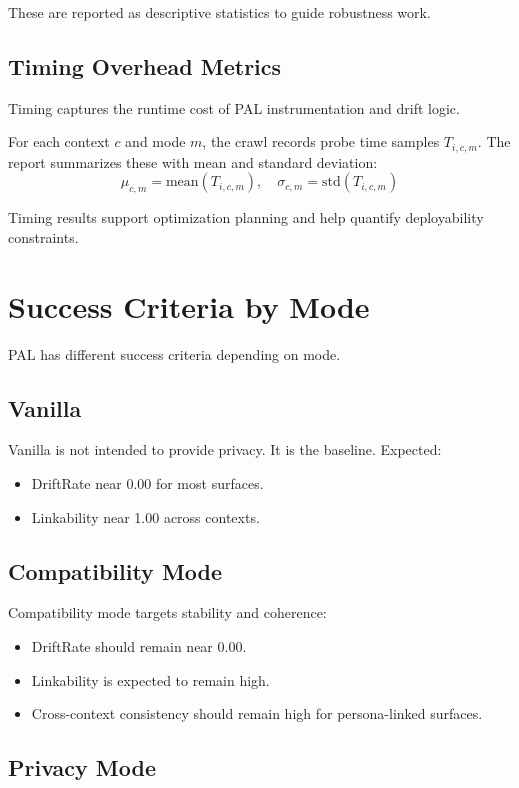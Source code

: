 \documentclass[11pt]{report}
\begin{document}
These are reported as descriptive statistics to guide robustness work.

\subsection{Timing Overhead Metrics}

Timing captures the runtime cost of PAL instrumentation and drift logic.

For each context $c$ and mode $m$, the crawl records probe time samples $T_{i,c,m}$.
The report summarizes these with mean and standard deviation:
\[
\mu_{c,m} = \text{mean}(T_{i,c,m}), \quad \sigma_{c,m} = \text{std}(T_{i,c,m})
\]

Timing results support optimization planning and help quantify deployability constraints.

\section{Success Criteria by Mode}

PAL has different success criteria depending on mode.

\subsection{Vanilla}

Vanilla is not intended to provide privacy. It is the baseline.
Expected:
\begin{itemize}
    \item DriftRate near 0.00 for most surfaces.
    \item Linkability near 1.00 across contexts.
\end{itemize}

\subsection{Compatibility Mode}

Compatibility mode targets stability and coherence:
\begin{itemize}
    \item DriftRate should remain near 0.00.
    \item Linkability is expected to remain high.
    \item Cross-context consistency should remain high for persona-linked surfaces.
\end{itemize}

\subsection{Privacy Mode}
\end{document}

